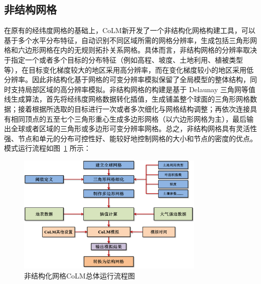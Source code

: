 \subsection{非结构网格}\label{非结构网格}
在原有的经纬度网格的基础上，CoLM新开发了一个非结构化网格构建工具，可以基于多个水平分布特征，自动识别不同区域所需的网格分辨率，生成包括三角形网格和六边形网格在内的无规则拓扑关系网格。具体而言，非结构网格的分辨率取决于指定一个或者多个目标的分布特征（例如高程、坡度、土地利用、植被类型等），在目标变化梯度较大的地区采用高分辨率，而在变化梯度较小的地区采用低分辨率。因此非结构化基于网格的可变分辨率模拟保留了全局模型的整体结构，同时支持局部区域的高分辨率模拟。非结构网格的构建是基于 Delaunay 三角网等值线生成算法，首先将经纬度网格数据转化插值，生成铺盖整个球面的三角形网格数据；接着根据所选取的目标进行一次或者多次细化与网格结构调整；再依次连接具有相同顶点的五至七个三角形重心生成多边形网格（以六边形网格为主），最后输出全球或者区域的三角形或多边形可变分辨率网格。总之，非结构网格具有灵活性强、节点和单元的分布可控性好、能较好地控制网格的大小和节点的密度的优点。模式运行流程如图~\ref{fig:非结构化网格CoLM总体运行流程图} 所示：
 {
\begin{figure}[htbp]
\centering
\includegraphics[width=0.8\textwidth]{Figures/模式构架/非结构化网格CoLM总体运行流程图.png}
\caption{非结构化网格CoLM总体运行流程图}
\label{fig:非结构化网格CoLM总体运行流程图}
\end{figure}
}

